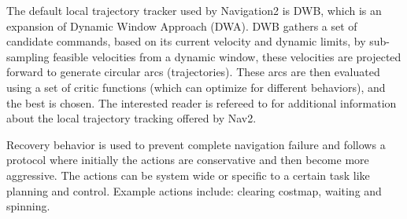 The default local trajectory tracker used by Navigation2 is DWB, which is an expansion of Dynamic Window Approach (DWA)\:\cite{liu_path_2023}\cite{macenski_desks_2023}. DWB gathers a set of candidate commands, based on its current velocity and dynamic limits, by sub-sampling feasible velocities from a dynamic window, these velocities are projected forward to generate circular arcs (trajectories)\:\cite{macenski_desks_2023}. These arcs are then evaluated using a set of critic functions (which can optimize for different behaviors), and the best is chosen\:\cite{macenski_desks_2023}.
The interested reader is refereed to\:\cite{macenski_desks_2023} for additional information about the local trajectory tracking offered by Nav2.

Recovery behavior is used to prevent complete navigation failure and follows a protocol where initially the actions are conservative and then become more aggressive\:\cite{macenski_marathon_2020}. The actions can be system wide or specific to a certain task like planning and control\:\cite{macenski_marathon_2020}. Example actions include: clearing costmap, waiting and spinning\:\cite{macenski_marathon_2020}.



\begin{comment}
    , replacing Navigation Function (NavFn)\:\cite{macenski_desks_2023}
\end{comment}
